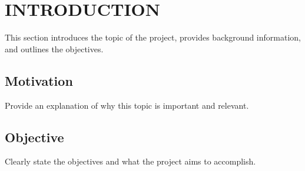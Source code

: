 

\section{INTRODUCTION}

    This section introduces the topic of the project, provides background information, and outlines the objectives.

    \subsection{Motivation}

        Provide an explanation of why this topic is important and relevant.

    \subsection{Objective}

        Clearly state the objectives and what the project aims to accomplish.
